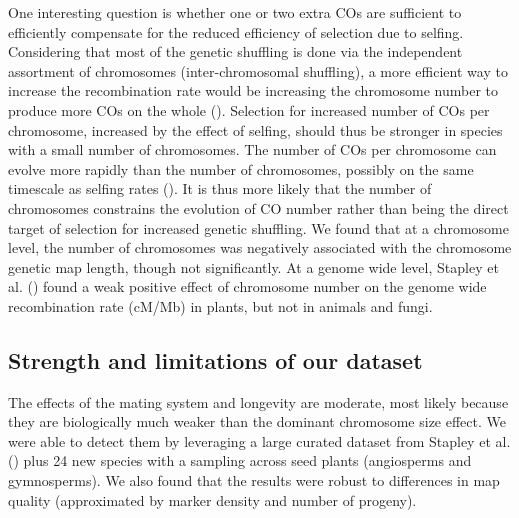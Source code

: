\documentclass{article}
\begin{document}
One interesting question is whether one or two extra COs are sufficient to efficiently compensate for the reduced efficiency of selection due to selfing. Considering that most of the genetic shuffling is done via the independent assortment of chromosomes (inter-chromosomal shuffling), a more efficient way to increase the recombination rate would be increasing the chromosome number to produce more COs on the whole (\cite{vellerRigorousMeasureGenomewide2019}). Selection for increased number of COs per chromosome, increased by the effect of selfing, should thus be stronger in species with a small number of chromosomes. The number of COs per chromosome can evolve more rapidly than the number of chromosomes, possibly on the same timescale as selfing rates (\cite{hendersonEvolutionPlasticityGenomeWide2021,whiteheadPlantMatingSystems2018}). It is thus more likely that the number of chromosomes constrains the evolution of CO number rather than being the direct target of selection for increased genetic shuffling. We found that at a chromosome level, the number of chromosomes was negatively associated with the chromosome genetic map length, though not significantly. At a genome wide level, Stapley et al. (\citeyear{stapleyVariationRecombinationFrequency2017}) found a weak positive effect of chromosome number on the genome wide recombination rate (cM/Mb) in plants, but not in animals and fungi.


\subsection*{Strength and limitations of our dataset}


The effects of the mating system and longevity are moderate, most likely because they are biologically much weaker than the dominant chromosome size effect. We were able to detect them by leveraging a large curated dataset from Stapley et al. (\citeyear{stapleyVariationRecombinationFrequency2017}) plus 24 new species with a sampling across seed plants (angiosperms and gymnosperms). We also found that the results were robust to differences in map quality (approximated by marker density and number of progeny).
\end{document}
